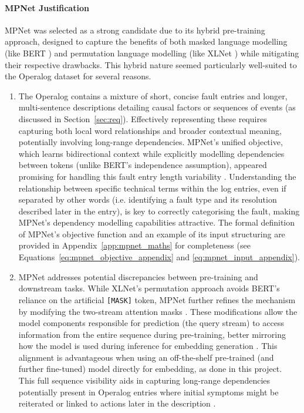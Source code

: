\documentclass[10pt,oneside]{report}
\begin{document}
\paragraph{MPNet Justification}
MPNet \cite{song2020mpnet} was selected as a strong candidate due to its hybrid pre-training approach, designed to capture the benefits of both masked language modelling (like BERT \cite{devlin2019bert}) and permutation language modelling (like XLNet \cite{yang2019xlnet}) while mitigating their respective drawbacks. This hybrid nature seemed particularly well-suited to the Operalog dataset for several reasons.

\begin{enumerate}
    \item The Operalog contains a mixture of short, concise fault entries and longer, multi-sentence descriptions detailing causal factors or sequences of events (as discussed in Section~\ref{sec:req}). Effectively representing these requires capturing both local word relationships and broader contextual meaning, potentially involving long-range dependencies. MPNet's unified objective, which learns bidirectional context while explicitly modelling dependencies between tokens (unlike BERT's independence assumption), appeared promising for handling this fault entry length variability \cite{song2020mpnet}. Understanding the relationship between specific technical terms within the log entries, even if separated by other words (i.e. identifying a fault type and its resolution described later in the entry), is key to correctly categorising the fault, making MPNet's dependency modelling capabilities attractive. The formal definition of MPNet's objective function and an example of its input structuring are provided in Appendix~\ref{app:mpnet_maths} for completeness (see Equations~\ref{eq:mpnet_objective_appendix} and \ref{eq:mpnet_input_appendix}). 

    \item MPNet addresses potential discrepancies between pre-training and downstream tasks. While XLNet's permutation approach avoids BERT's reliance on the artificial \texttt{[MASK]} token, MPNet further refines the mechanism by modifying the two-stream attention masks \cite{song2020mpnet}. These modifications allow the model components responsible for prediction (the query stream) to access information from the entire sequence during pre-training, better mirroring how the model is used during inference for embedding generation \cite{song2020mpnet}. This alignment is advantageous when using an off-the-shelf pre-trained (and further fine-tuned) model directly for embedding, as done in this project. This full sequence visibility aids in capturing long-range dependencies potentially present in Operalog entries where initial symptoms might be reiterated or linked to actions later in the description \cite{song2020mpnet}.


\end{enumerate}
\end{document}
